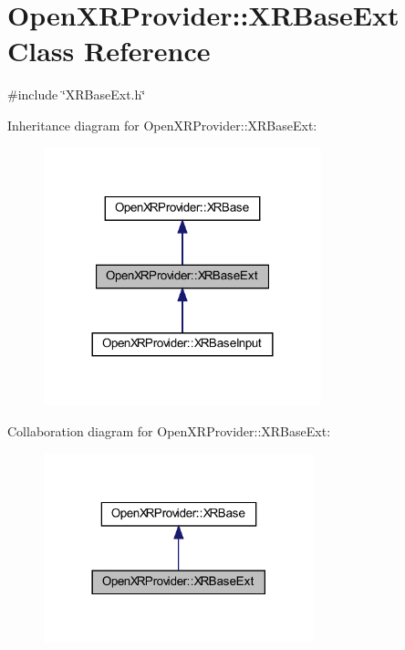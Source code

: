 \hypertarget{class_open_x_r_provider_1_1_x_r_base_ext}{}\section{Open\+X\+R\+Provider\+::X\+R\+Base\+Ext Class Reference}
\label{class_open_x_r_provider_1_1_x_r_base_ext}


{\ttfamily \#include \char`\"{}X\+R\+Base\+Ext.\+h\char`\"{}}



Inheritance diagram for Open\+X\+R\+Provider\+::X\+R\+Base\+Ext\+:
\nopagebreak
\begin{figure}[H]
\begin{center}
\leavevmode
\includegraphics[width=228pt]{class_open_x_r_provider_1_1_x_r_base_ext__inherit__graph}
\end{center}
\end{figure}


Collaboration diagram for Open\+X\+R\+Provider\+::X\+R\+Base\+Ext\+:
\nopagebreak
\begin{figure}[H]
\begin{center}
\leavevmode
\includegraphics[width=222pt]{class_open_x_r_provider_1_1_x_r_base_ext__coll__graph}
\end{center}
\end{figure}

